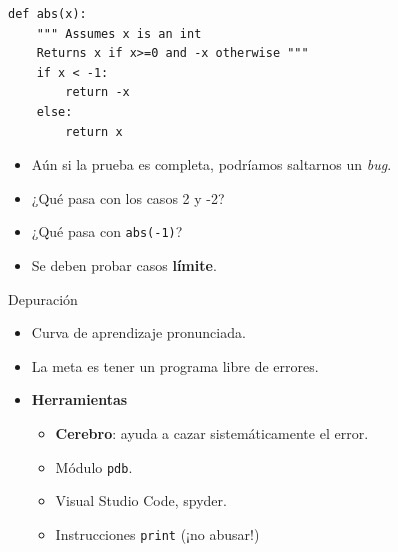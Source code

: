 \documentclass[mathserif]{beamer}
\begin{document}
\begin{frame}[fragile]{}
\begin{lstlisting}
def abs(x):
    """ Assumes x is an int
    Returns x if x>=0 and -x otherwise """
    if x < -1:
        return -x
    else:
        return x
\end{lstlisting}
    \begin{itemize}
        \item Aún si la prueba es {\orange completa}, podríamos saltarnos un \textit{bug}.
        \item ¿Qué pasa con los casos 2 y -2?
        \item ¿Qué pasa con \lstinline|abs(-1)|?
        \item Se deben probar casos {\orange\bfseries límite}.
    \end{itemize}
\end{frame}

\begin{frame}[fragile]{Depuración}
    \begin{itemize}
        \item Curva de aprendizaje pronunciada.
        
        \item La meta es tener un programa libre de errores.
        
        \item {\blue\bfseries Herramientas}
        \begin{itemize}
            \item {\blue\bfseries Cerebro}: ayuda a cazar {\blue sistemáticamente} el error.
            \item Módulo \lstinline|pdb|.
            \item Visual Studio Code, spyder.
            \item Instrucciones \lstinline|print| (¡no abusar!)
        \end{itemize}
    \end{itemize}
\end{frame}
\end{document}
